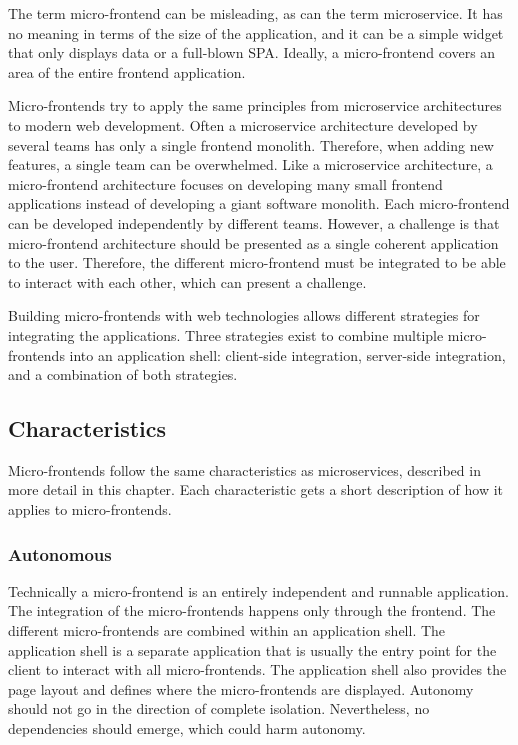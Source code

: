 \bigskip

\noindent The term micro-frontend can be misleading, as can the term microservice. It has no meaning in terms of the size of the application, and it can be a simple widget that only displays data or a full-blown \ac{SPA}. Ideally, a micro-frontend covers an area of the entire frontend application.

\bigskip

\noindent Micro-frontends try to apply the same principles from microservice architectures to modern web development. Often a microservice architecture developed by several teams has only a single frontend monolith. Therefore, when adding new features, a single team can be overwhelmed. Like a microservice architecture, a micro-frontend architecture focuses on developing many small frontend applications instead of developing a giant software monolith. Each micro-frontend can be developed independently by different teams. However, a challenge is that micro-frontend architecture should be presented as a single coherent application to the user. Therefore, the different micro-frontend must be integrated to be able to interact with each other, which can present a challenge.

\bigskip

\noindent Building micro-frontends with web technologies allows different strategies for integrating the applications. Three strategies exist to combine multiple micro-frontends into an application shell: client-side integration, server-side integration, and a combination of both strategies. \cite[10-12]{book:2020:geers:background:micro-frontends:micro-frontends-in-action}

\subsection{Characteristics}\label{subsection:background:micro-frontend-characteristics}

Micro-frontends follow the same characteristics as microservices, described in more detail in this chapter. Each characteristic gets a short description of how it applies to micro-frontends.

\subsubsection{Autonomous}\label{subsubsection:background:micro-frontend-autonomous}

Technically a micro-frontend is an entirely independent and runnable application. The integration of the micro-frontends happens only through the frontend. The different micro-frontends are combined within an application shell. The application shell is a separate application that is usually the entry point for the client to interact with all micro-frontends. The application shell also provides the page layout and defines where the micro-frontends are displayed. Autonomy should not go in the direction of complete isolation. Nevertheless, no dependencies should emerge, which could harm autonomy. \cite{book:2020:geers:background:micro-frontends:micro-frontends-in-action}

